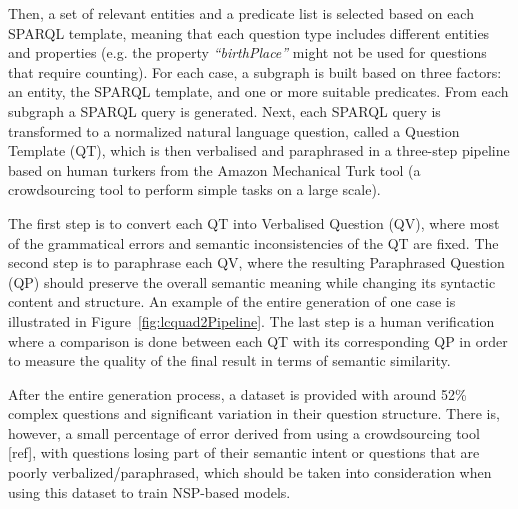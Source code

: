 Then, a set of relevant entities and a predicate list is selected based on each SPARQL template, 
meaning that each question type includes different entities and properties (e.g. the property 
\textit{“birthPlace”} might not be used for questions that require counting). For each case, a 
subgraph is built based on three factors: an entity, the SPARQL template, and one or more 
suitable predicates. From each subgraph a SPARQL query is generated. Next, each SPARQL query is 
transformed to a normalized natural language question, called a Question Template (QT), which is 
then verbalised and paraphrased in a three-step pipeline based on human turkers from the Amazon 
Mechanical Turk tool (a crowdsourcing tool to perform simple tasks on a large scale). 

The first step is to convert each QT into Verbalised Question (QV), where most of the 
grammatical errors and semantic inconsistencies of the QT are fixed. The second step is to 
paraphrase each QV, where the resulting Paraphrased Question (QP) should preserve the overall 
semantic meaning while changing its syntactic content and structure. An example of the entire 
generation of one case is illustrated in Figure~\ref{fig:lcquad2Pipeline}. The last step is a 
human verification where a comparison is done between each QT with its corresponding QP in 
order to measure the quality of the final result in terms of semantic similarity.

After the entire generation process, a dataset is provided with around 52\% complex questions 
and significant variation in their  question structure. There is, however, a small percentage 
of error derived from using a crowdsourcing tool [ref], with questions losing part of their 
semantic intent or questions that are poorly verbalized/paraphrased, which should be taken into 
consideration when using this dataset to train NSP-based models. 
